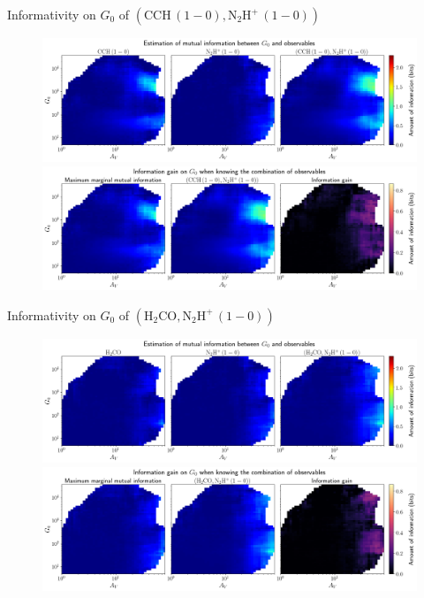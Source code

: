 \documentclass{beamer}
\begin{document}
\begin{frame}{Informativity on $G_0$ of $\left(\mathrm{CCH\,(1-0)},\mathrm{N_2H^+\,(1-0)}\right)$}
    \begin{figure}
        \centering
        \includegraphics[width=0.95\linewidth]{../mi/g0__cch10_n2hp10_mi.png}
        \vfill
        \includegraphics[width=0.95\linewidth]{../mi/g0__cch10_n2hp10_mi_gain.png}
    \end{figure}
\end{frame}

\begin{frame}{Informativity on $G_0$ of $\left(\mathrm{H_2CO},\mathrm{N_2H^+\,(1-0)}\right)$}
    \begin{figure}
        \centering
        \includegraphics[width=0.95\linewidth]{../mi/g0__h2co_n2hp10_mi.png}
        \vfill
        \includegraphics[width=0.95\linewidth]{../mi/g0__h2co_n2hp10_mi_gain.png}
    \end{figure}
\end{frame}
\end{document}
